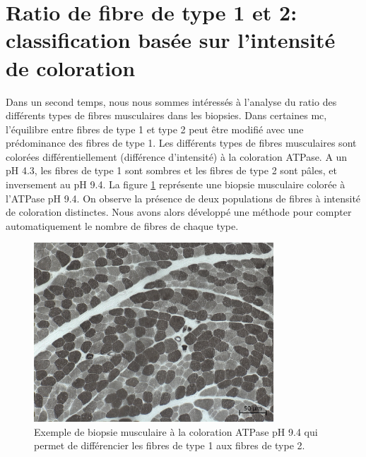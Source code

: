 \section{Ratio de fibre de type 1 et 2: classification basée sur l'intensité de coloration}

Dans un second temps, nous nous sommes intéressés à l'analyse du ratio des différents types de fibres musculaires dans les biopsies. Dans certaines \gls{mc}, l'équilibre entre fibres de type 1 et type 2 peut être modifié avec une prédominance des fibres de type 1. Les différents types de fibres musculaires sont colorées différentiellement (différence d'intensité) à la coloration ATPase. A un pH 4.3, les fibres de type 1 sont sombres et les fibres de type 2 sont pâles, et inversement au pH 9.4. La figure \ref{fig:atp_example} représente une biopsie musculaire colorée à l'ATPase pH 9.4. On observe la présence de deux populations de fibres à intensité de coloration distinctes. Nous avons alors développé une méthode pour compter automatiquement le nombre de fibres de chaque type.
\begin{figure}[htbp]
 \centering
 \includegraphics[width=0.8\textwidth]{figures/atp_example.png}
 \caption[Exemple de biopsie musculaire à la coloration ATPase pH 9.4]{Exemple de biopsie musculaire à la coloration ATPase pH 9.4 qui permet de différencier les fibres de type 1 aux fibres de type 2.}
 \label{fig:atp_example}
\end{figure}
